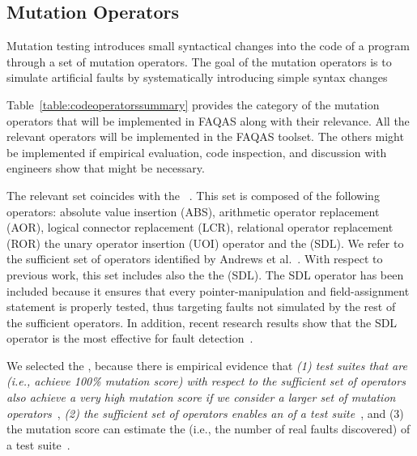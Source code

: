 
\subsection{Mutation Operators}
\label{sec:operators}

Mutation testing introduces small syntactical changes into the code of a program 
through a set of mutation operators.
The goal of the mutation operators is to simulate artificial faults by systematically introducing  simple syntax changes 



Table~\ref{table:codeoperatorssummary} provides the  category of the mutation operators that will be implemented in FAQAS along with their relevance. All the relevant operators will be implemented in the FAQAS toolset. The others might be implemented if empirical evaluation, code inspection, and discussion with engineers show that might be necessary.

The relevant set coincides with the ~\cite{rothermel1996experimental,andrews2005mutation}.
This set is composed of the following operators: absolute value insertion (ABS), arithmetic operator replacement (AOR), logical connector replacement (LCR), relational operator replacement (ROR) the unary operator insertion (UOI) operator and the  (SDL).
We refer to the sufficient set of operators identified by Andrews et al.~\cite{andrews2005mutation}. With respect to previous work, this set includes also the the  (SDL). The SDL operator has been included because it ensures that every pointer-manipulation and field-assignment statement is properly tested, thus targeting faults not simulated by the rest of the sufficient operators. In addition, recent research results show that the SDL operator is the most effective for fault detection~\cite{delamaro2014designing}. 


We selected the , because
there is empirical evidence that \emph{(1) test suites that are  (i.e., achieve 100\% mutation score) with respect to the sufficient set of operators also achieve a very high mutation score if we consider a larger set of mutation operators}~\cite{offutt1996experimental}, \emph{(2) the sufficient set of operators enables an  of a test suite}~\cite{siami2008sufficient}, and (3) the mutation score can estimate the  (i.e., the number of real faults discovered) of a test suite~\cite{andrews2005mutation}.





